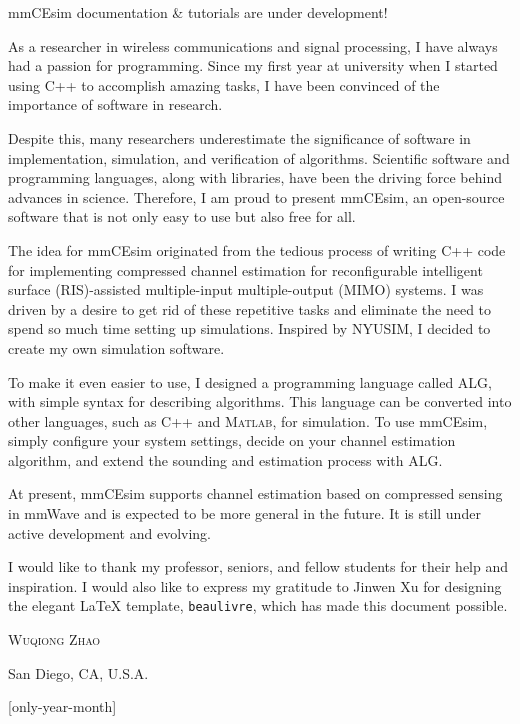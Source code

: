 \begin{tip}
  mmCEsim documentation \& tutorials are under development!
\end{tip}

As a researcher in wireless communications and signal processing,
I have always had a passion for programming.
Since my first year at university
when I started using C++ to accomplish amazing tasks,
I have been convinced of the importance of software in research.

Despite this, many researchers underestimate the significance of software
in implementation, simulation, and verification of algorithms.
Scientific software and programming languages, along with libraries,
have been the driving force behind advances in science.
Therefore, I am proud to present mmCEsim,
an open-source software that is not only easy to use but also free for all.

The idea for mmCEsim originated from the tedious process of writing C++ code
for implementing compressed channel estimation for
reconfigurable intelligent surface (RIS)-assisted multiple-input multiple-output (MIMO) systems.
I was driven by a desire to get rid of these repetitive tasks and eliminate the need
to spend so much time setting up simulations.
Inspired by NYUSIM, I decided to create my own simulation software.

To make it even easier to use, I designed a programming language called ALG,
with simple syntax for describing algorithms.
This language can be converted into other languages, such as C++ and \textsc{Matlab}, for simulation.
To use mmCEsim, simply configure your system settings, decide on your channel estimation algorithm,
and extend the sounding and estimation process with ALG.

At present, mmCEsim supports channel estimation based on compressed sensing in mmWave
and is expected to be more general in the future.
It is still under active development and evolving.

I would like to thank my professor, seniors, and fellow students for their help and inspiration.
I would also like to express my gratitude to Jinwen Xu for designing the elegant \LaTeX{} template,
\texttt{beaulivre}, which has made this document possible.

\begin{flushright}
  \textsc{Wuqiong Zhao}

  San Diego, CA, U.S.A.

  \TheDate{\the\year/\the\month}[only-year-month]
\end{flushright}
